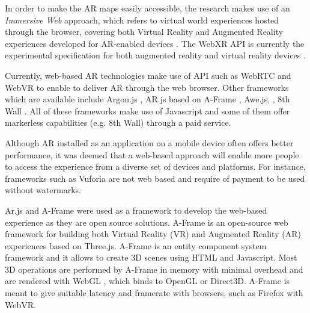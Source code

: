 \documentclass[acmlarge,screen,dvipsnames]{acmart}
\begin{document}
In order to make the AR maps easily
accessible, the research makes use of an \emph{Immersive Web} approach, which
refers to virtual world experiences hosted through the browser, covering both
Virtual Reality and Augmented Reality experiences developed for AR-enabled
devices \cite{imweb}. The WebXR API is currently the experimental
specification for both augmented reality and virtual reality devices
\cite{webxr}.

Currently, web-based AR technologies make use of API such as WebRTC and WebVR
to enable to deliver AR through the web browser. Other frameworks which are
available include Argon.js \cite{Argon.js}, AR.js based on A-Frame
\cite{aframe}, Awe.js, \cite{Awe.js}, 8th Wall \cite{8th}. All of these
frameworks make use of Javascript and some of them offer markerless
capabilities (e.g. 8th Wall) through a paid service.

Although AR installed as an application on a mobile device often offers better
performance, it was deemed that a web-based approach will enable more people
to access the experience from a diverse set of devices and platforms. For
instance, frameworks such as Vuforia \cite{Vuforia} are not web based and
require of payment to be used without watermarks. 

Ar.js and A-Frame were used as a framework to develop the web-based experience
as they are open source solutions. A-Frame is an open-source web framework for
building both Virtual Reality (VR) and Augmented Reality (AR) experiences
based on Three.js. A-Frame is an entity component system framework and it
allows to create 3D scenes using HTML and Javascript. Most 3D operations are
performed by A-Frame in memory with minimal overhead and are rendered with
WebGL \cite{webgl}, which binds to OpenGL or Direct3D. A-Frame is meant to
give suitable latency and framerate with browsers, such as Firefox with WebVR.
\end{document}
